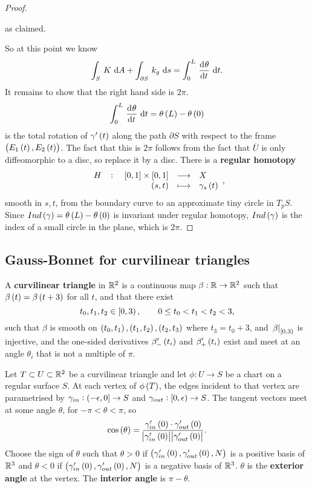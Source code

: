 \begin{proof}
\begin{itemize}
as claimed.
\end{itemize}
So at this point we know
$$ \intd{S}{}{K}{A} + \intd{\partial S}{}{k_g}{s} = \intd{0}{L}{\dod{\theta}{t}}{t}. $$
It remains to show that the right hand side is $ 2\pi $.
$$ \intd{0}{L}{\dod{\theta}{t}}{t} = \theta\br{L} - \theta\br{0} $$
is the total rotation of $ \gamma'\br{t} $ along the path $ \partial S $ with respect to the frame $ \br{E_1\br{t}, E_2\br{t}} $. The fact that this is $ 2\pi $ follows from the fact that $ \overline{U} $ is only diffeomorphic to a disc, so replace it by a disc. There is a \textbf{regular homotopy}
$$ \function[H]{\sbr{0, 1} \times \sbr{0, 1}}{X}{\br{s, t}}{\gamma_s\br{t}}, $$
smooth in $ s, t $, from the boundary curve to an approximate tiny circle in $ T_pS $. Since $ Ind\br{\gamma} = \theta\br{L} - \theta\br{0} $ is invariant under regular homotopy, $ Ind\br{\gamma} $ is the index of a small circle in the plane, which is $ 2\pi $.
\end{proof}

\pagebreak

\subsection{Gauss-Bonnet for curvilinear triangles}


\begin{definition}
A \textbf{curvilinear triangle} in $ \mathbb{R}^2 $ is a continuous map $ \beta : \mathbb{R} \to \mathbb{R}^2 $ such that $ \beta\br{t} = \beta\br{t + 3} $ for all $ t $, and that there exist
$$ t_0, t_1, t_2 \in \intco{0, 3}, \qquad 0 \le t_0 < t_1 < t_2 < 3, $$
such that $ \beta $ is smooth on $ \br{t_0, t_1}, \br{t_1, t_2}, \br{t_2, t_3} $ where $ t_3 = t_0 + 3 $, and $ \eval{\beta}_{\intco{0, 3}} $ is injective, and the one-sided derivatives $ \beta_-'\br{t_i} $ and $ \beta_+'\br{t_i} $ exist and meet at an angle $ \theta_i $ that is not a multiple of $ \pi $.
\end{definition}

Let $ T \subset U \subset \mathbb{R}^2 $ be a curvilinear triangle and let $ \phi : U \to S $ be a chart on a regular surface $ S $. At each vertex of $ \phi\br{T} $, the edges incident to that vertex are parametrised by $ \gamma_{in} : \intoc{-\epsilon, 0} \to S $ and $ \gamma_{out} : \intco{0, \epsilon} \to S $. The tangent vectors meet at some angle $ \theta $, for $ -\pi < \theta < \pi $, so
$$ \cos\br{\theta} = \dfrac{\gamma_{in}'\br{0} \cdot \gamma_{out}'\br{0}}{\abs{\gamma_{in}'\br{0}}\abs{\gamma_{out}'\br{0}}}. $$
Choose the sign of $ \theta $ such that $ \theta > 0 $ if $ \br{\gamma_{in}'\br{0}, \gamma_{out}'\br{0}, N} $ is a positive basis of $ \mathbb{R}^3 $ and $ \theta < 0 $ if $ \br{\gamma_{in}'\br{0}, \gamma_{out}'\br{0}, N} $ is a negative basis of $ \mathbb{R}^3 $. $ \theta $ is the \textbf{exterior angle} at the vertex. The \textbf{interior angle} is $ \pi - \theta $.

